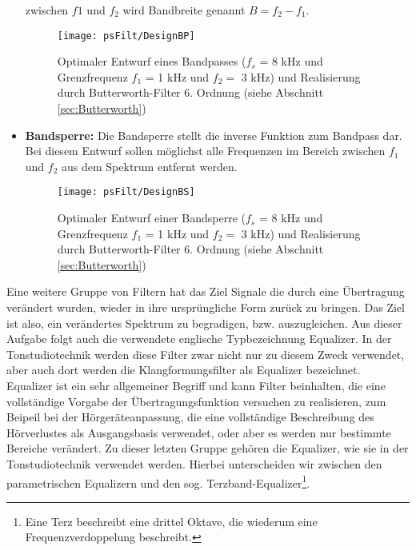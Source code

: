 \begin{itemize}
    zwischen $f1$ und $f_2$ wird Bandbreite genannt $B = f_2 -
    f_1$.
    \begin{figure}[H]
    \begin{center}
    \texttt{[image: psFilt/DesignBP]}
    \caption{\label{pic:DesignBP}Optimaler Entwurf eines Bandpasses ($f_s$ = 8 kHz und
    Grenzfrequenz $f_1$ = 1 kHz und $f_2 = $ 3 kHz) und Realisierung durch Butterworth-Filter 6. Ordnung
    (siehe Abschnitt \ref{sec:Butterworth})}
    \end{center}
    \end{figure}
    \item {\bf Bandsperre:} Die Bandsperre stellt die inverse
    Funktion zum Bandpass dar. Bei diesem Entwurf sollen möglichst
    alle Frequenzen im Bereich zwischen $f_1$ und $f_2$ aus dem
    Spektrum entfernt werden.
    \begin{figure}[H]
    \begin{center}
    \texttt{[image: psFilt/DesignBS]}
    \caption{\label{pic:DesignBP}Optimaler Entwurf einer Bandsperre ($f_s$ = 8 kHz und
    Grenzfrequenz $f_1$ = 1 kHz und $f_2 = $ 3 kHz) und Realisierung durch Butterworth-Filter 6. Ordnung
    (siehe Abschnitt \ref{sec:Butterworth})}
    \end{center}
    \end{figure}
\end{itemize}

Eine weitere Gruppe von Filtern hat das Ziel Signale die durch
eine Übertragung verändert wurden, wieder in ihre ursprüngliche
Form zurück zu bringen. Das Ziel ist also, ein verändertes
Spektrum zu begradigen, bzw. auszugleichen. Aus dieser Aufgabe
folgt auch die verwendete englische Typbezeichnung Equalizer. In
der Tonstudiotechnik werden diese Filter zwar nicht nur zu diesem
Zweck verwendet, aber auch dort werden die Klangformungsfilter als
Equalizer bezeichnet. Equalizer ist ein sehr allgemeiner Begriff
und kann Filter beinhalten, die eine vollständige Vorgabe der
Übertragungsfunktion versuchen zu realisieren, zum Beipeil bei der
Hörgeräteanpassung, die eine vollständige Beschreibung des
Hörverlustes als Ausgangsbasis verwendet, oder aber es werden nur
bestimmte Bereiche verändert. Zu dieser letzten Gruppe gehören die
Equalizer, wie sie in der Tonstudiotechnik verwendet werden.
Hierbei unterscheiden wir zwischen den parametrischen Equalizern
und den sog. Terzband-Equalizer\footnote{Eine Terz beschreibt eine
drittel Oktave, die wiederum eine Frequenzverdoppelung
beschreibt.}.

